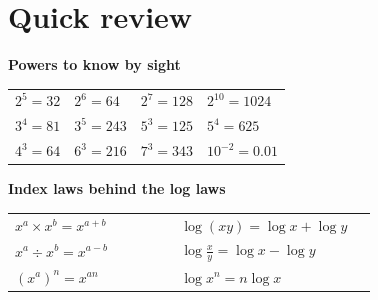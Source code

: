 \documentclass[11pt]{article}
\begin{document}
\section{Quick review}\label{h2:review}
\renewcommand\arraystretch{1.45}
\begin{minipage}[t]{0.47\textwidth}\vspace{0pt}
\textbf{Powers to know by sight}\par\smallskip
\begin{tabular}{@{}l l l l@{}}
\toprule
$2^{5} = 32$ & $2^{6} = 64$ & $2^{7} = 128$ & $2^{10} = 1024$\\
$3^{4} = 81$ & $3^{5} = 243$ & $5^{3} = 125$ & $5^{4} = 625$\\
$4^{3} = 64$ & $6^{3} = 216$ & $7^{3} = 343$ & $10^{-2} = 0.01$\\
\bottomrule
\end{tabular}
\end{minipage}\hfill
\begin{minipage}[t]{0.47\textwidth}\vspace{0pt}
\textbf{Index laws behind the log laws}\par\smallskip
\begin{tabular}{@{}>{\raggedright}p{0.42\linewidth} >{\raggedright\arraybackslash}p{0.5\linewidth}@{}}
\toprule
$x^{a}\times x^{b} = x^{a+b}$ & $\log(xy) = \log x + \log y$ \\
$x^{a} \div x^{b} = x^{a-b}$ & $\log\frac{x}{y} = \log x - \log y$ \\
$(x^{a})^{n} = x^{an}$ & $\log x^{n} = n\log x$ \\
\bottomrule
\end{tabular}
\end{minipage}
\end{document}
